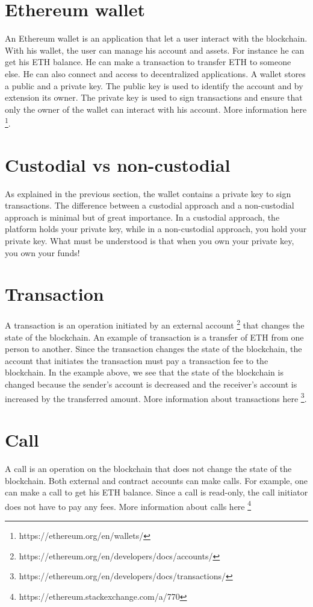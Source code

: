 \documentclass[a4paper,11pt,oneside]{report}
\begin{document}
\section{Ethereum wallet}
An Ethereum wallet is an application that let a user interact with the blockchain. With his wallet, the user can manage his account and assets. For instance he can get his ETH balance. He can make a transaction to transfer ETH to someone else. He can also connect and access to decentralized applications. A wallet stores a public and a private key. The public key is used to identify the account and by extension its owner. The private key is used to sign transactions and ensure that only the owner of the wallet can interact with his account. More information here \footnote{https://ethereum.org/en/wallets/}.

\section{Custodial vs non-custodial}
As explained in the previous section, the wallet contains a private key to sign transactions. The difference between a custodial approach and a non-custodial approach is minimal but of great importance. In a custodial approach, the platform holds your private key, while in a non-custodial approach, you hold your private key. What must be understood is that when you own your private key, you own your funds!

\section{Transaction}
A transaction is an operation initiated by an external account \footnote{https://ethereum.org/en/developers/docs/accounts/} that changes the state of the blockchain. An example of transaction is a transfer of ETH from one person to another. Since the transaction changes the state of the blockchain, the account that initiates the transaction must pay a transaction fee to the blockchain. In the example above, we see that the state of the blockchain is changed because the sender's account is decreased and the receiver's account is increased by the transferred amount. More information about transactions here \footnote{https://ethereum.org/en/developers/docs/transactions/}.

\section{Call}
A call is an operation on the blockchain that does not change the state of the blockchain. Both external and contract accounts can make calls. For example, one can make a call to get his ETH balance. Since a call is read-only, the call initiator does not have to pay any fees. More information about calls here \footnote{https://ethereum.stackexchange.com/a/770}
\end{document}
